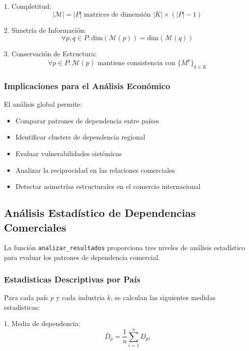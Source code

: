 \documentclass[11pt,a4paper]{article}
\begin{document}
1. Completitud:
\begin{equation}
|\mathcal{M}| = |P| \text{ matrices de dimensión } |K| \times (|P|-1)
\end{equation}

2. Simetría de Información:
\begin{equation}
\forall p,q \in P: \text{dim}(\mathcal{M}(p)) = \text{dim}(\mathcal{M}(q))
\end{equation}

3. Conservación de Estructura:
\begin{equation}
\forall p \in P: \mathcal{M}(p) \text{ mantiene consistencia con } \{M^k\}_{k \in K}
\end{equation}

\subsubsection{Implicaciones para el Análisis Económico}

El análisis global permite:

\begin{itemize}
    \item Comparar patrones de dependencia entre países
    \item Identificar clusters de dependencia regional
    \item Evaluar vulnerabilidades sistémicas
    \item Analizar la reciprocidad en las relaciones comerciales
    \item Detectar asimetrías estructurales en el comercio internacional
\end{itemize}


\subsection{Análisis Estadístico de Dependencias Comerciales}

La función \texttt{analizar\_resultados} proporciona tres niveles de análisis estadístico para evaluar los patrones de dependencia comercial.

\subsubsection{Estadísticas Descriptivas por País}

Para cada país $p$ y cada industria $k$, se calculan las siguientes medidas estadísticas:

1. Media de dependencia:
\begin{equation}
\bar{D}_p = \frac{1}{n} \sum_{i=1}^n D_{pi}
\end{equation}
\end{document}
